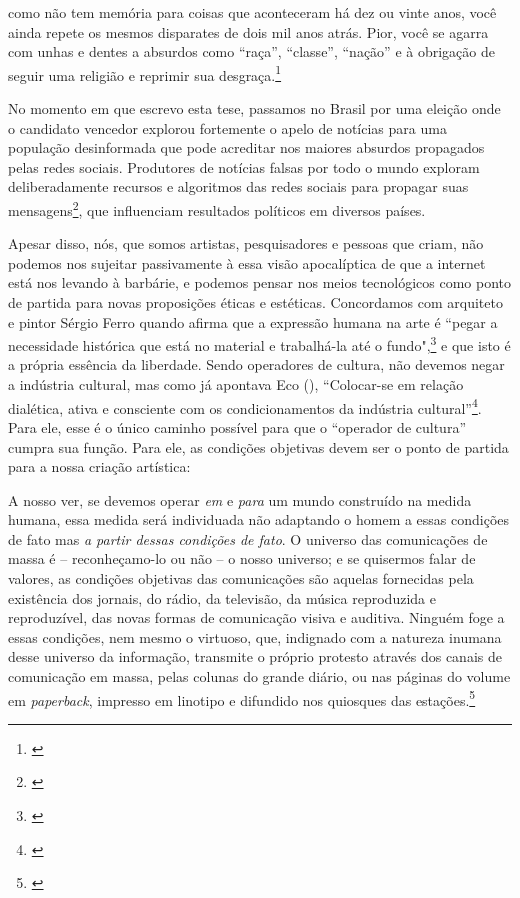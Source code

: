 \begin{citacao}
como não tem memória para coisas que aconteceram há dez ou vinte anos, você ainda repete os mesmos disparates de dois mil anos atrás. Pior, você se agarra com unhas e dentes a absurdos como ``raça'', ``classe'', ``nação'' e à obrigação de seguir uma religião e reprimir sua desgraça.\footnote{\cite[101]{reich1998escute}}
\end{citacao}

No momento em que escrevo esta tese, passamos no Brasil por uma eleição onde o candidato vencedor explorou fortemente o apelo de notícias para uma população desinformada que pode acreditar nos maiores absurdos propagados pelas redes sociais. Produtores de notícias falsas por todo o mundo exploram deliberadamente recursos e algoritmos das redes sociais para propagar suas mensagens\footnote{\cite{Martens2018}}, que influenciam resultados políticos em diversos países.

Apesar disso, nós, que somos artistas, pesquisadores e pessoas que criam, não podemos nos sujeitar passivamente à essa visão apocalíptica de que a internet está nos levando à barbárie, e podemos pensar nos meios tecnológicos como ponto de partida para novas proposições éticas e estéticas. Concordamos com arquiteto e pintor Sérgio Ferro quando afirma que a expressão humana na arte é ``pegar a necessidade histórica que está no material e trabalhá-la até o fundo",\footnote{\cite{FerroSergio2002}} e que isto é a própria essência da liberdade. Sendo operadores de cultura, não devemos negar a indústria cultural, mas como já apontava Eco (\citeyear{Eco1970}), ``Colocar-se em relação dialética, ativa e consciente com os condicionamentos da indústria cultural''\footnote{\cite[14]{Eco1970}}. Para ele, esse é o único caminho possível para que o ``operador de cultura'' cumpra sua função. Para ele, as condições objetivas devem ser o ponto de partida para a nossa criação artística: 



\begin{citacao}
A nosso ver, se devemos operar \emph{em} e \emph{para} um mundo construído na medida humana, essa medida será individuada não adaptando o homem a essas condições de fato mas \emph{a partir dessas condições de fato}. O universo das comunicações de massa é -- reconheçamo-lo ou não -- o nosso universo; e se quisermos falar de valores, as condições objetivas das comunicações são aquelas fornecidas pela existência dos jornais, do rádio, da televisão, da música reproduzida e reproduzível, das novas formas de comunicação visiva e auditiva. Ninguém foge a essas condições, nem mesmo o virtuoso, que, indignado com a natureza inumana desse universo da informação, transmite o próprio protesto através dos canais de comunicação em massa, pelas colunas do grande diário, ou nas páginas do volume em \emph{paperback}, impresso em linotipo e difundido nos quiosques das estações.\footnote{\cite[13]{Eco1970}}

\end{citacao}

